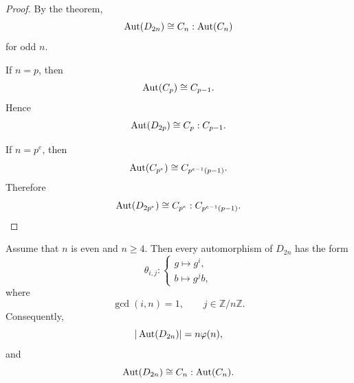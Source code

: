 \begin{proof}
By the theorem,
\[
    \operatorname{Aut}(D_{2n})
    \cong
    C_n:\operatorname{Aut}(C_n)
\]
for odd $n$.

If $n=p$, then
\[
    \operatorname{Aut}(C_p)\cong C_{p-1}.
\]
Hence
\[
    \operatorname{Aut}(D_{2p})
    \cong
    C_p:C_{p-1}.
\]

If $n=p^e$, then
\[
    \operatorname{Aut}(C_{p^e})
    \cong
    C_{p^{e-1}(p-1)}.
\]
Therefore
\[
    \operatorname{Aut}(D_{2p^e})
    \cong
    C_{p^e}:C_{p^{e-1}(p-1)}.
\]
\end{proof}

\begin{theorem}
    Assume that $n$ is even and $n\geq 4$. Then every automorphism of $D_{2n}$ has the form
    \[
        \theta_{i,j}:
        \begin{cases}
            g\longmapsto g^i,\\
            b\longmapsto g^j b,
        \end{cases}
    \]
    where
    \[
        \gcd(i,n)=1,
        \qquad
        j\in\mathbb Z/n\mathbb Z.
    \]
    Consequently,
    \[
        |\operatorname{Aut}(D_{2n})|=n\varphi(n),
    \]
    and
    \[
        \operatorname{Aut}(D_{2n})
        \cong
        C_n:\operatorname{Aut}(C_n).
    \]
    \end{theorem}
    
